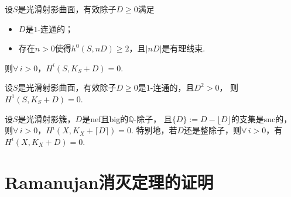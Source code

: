 \begin{theorem}[Ramanujan消灭定理]
    设$S$是光滑射影曲面，有效除子$D \geq 0$满足
    \begin{itemize}
        \item[(1)] $D$是$1$-连通的；
        \item[(2)] 存在$n > 0$使得$h^{0}(S,nD) \geq 2$，且$|nD|$是有理线束.
    \end{itemize}
    则$\forall \, i > 0$，$H^{i}(S,K_{S} + D) = 0$.
\end{theorem}

\begin{corollary}[Ramanujan]
    设$S$是光滑射影曲面，有效除子$D \geq 0$是$1$-连通的，且$D^{2} > 0$，
    则$H^{1}(S,K_{S} + D) = 0$.
\end{corollary}

\begin{theorem}[川又-Viehweg消灭定理]
    设$S$是光滑射影簇，$D$是nef且big的$\mathbb{Q}$-除子，
    且$\{D\} := D - \lfloor D \rfloor$的支集是snc的，
    则$\forall \, i > 0$，$H^{i}(X,K_{X} + \lceil D \rceil) = 0$.
    特别地，若$D$还是整除子，则$\forall \, i > 0$，有$H^{i}(X,K_{X} + D) = 0$.
\end{theorem}

\section{Ramanujan消灭定理的证明}